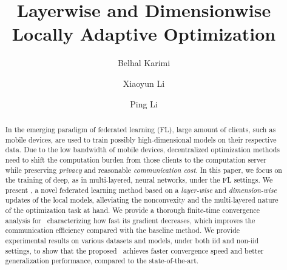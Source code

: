 \documentclass[manuscript,screen,review]{acmart}
\begin{document}
\title{Layerwise and Dimensionwise Locally Adaptive Optimization}

\author{Belhal Karimi}
\author{Xiaoyun Li}
\author{Ping Li}


\begin{abstract}
In the emerging paradigm of federated learning (FL), large amount of clients, such as mobile devices, are used to train possibly high-dimensional models on their respective data.
Due to the low bandwidth of mobile devices, decentralized optimization methods need to shift the computation burden from those clients to the computation server while preserving \emph{privacy} and reasonable \emph{communication cost}.
In this paper, we focus on the training of deep, as in multi-layered, neural networks, under the FL settings.
We present \algo, a novel federated learning method based on a \emph{layer-wise} and \emph{dimension-wise} updates of the local models, alleviating the nonconvexity and the multi-layered nature of the optimization task at hand.
We provide a thorough finite-time convergence analysis for \algo\ characterizing how fast its gradient decreases, which improves the communication efficiency compared with the baseline method. We provide experimental results on various datasets and models, under both iid and non-iid settings, to show that the proposed \algo\ achieves faster convergence speed and better generalization performance, compared to the state-of-the-art.
\end{abstract}







\maketitle
\end{document}
